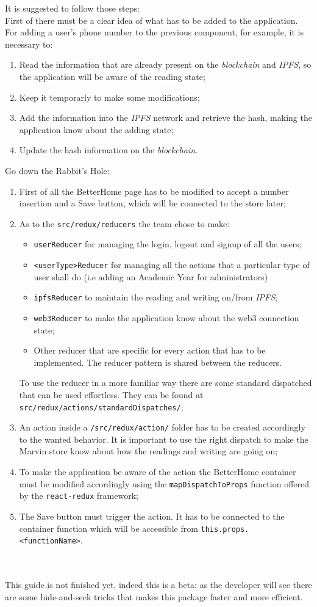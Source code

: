 It is suggested to follow those steps:
\\First of there must be a clear idea of what has to be added to the application. For adding a user's phone number to the previous component, for example, it is necessary to:
\begin{enumerate}
	\item Read the information that are already present on the \emph{blockchain} and \emph{IPFS}, so the application will be aware of the reading state;
	\item Keep it temporarly to make some modifications;
	\item Add the information into the \emph{IPFS} network and retrieve the hash, making the application know about the adding state;
	\item Update the hash information on the \emph{blockchain}.
\end{enumerate}

Go down the Rabbit's Hole:
\begin{enumerate}
	\item First of all the BetterHome page has to be modified to accept a number insertion and a Save button, which will be connected to the store later;
	\item As to the \verb|src/redux/reducers| the team chose to make:
	\begin{itemize}
		\item \verb|userReducer| for managing the login, logout and signup of all the users;
		\item \verb|<userType>Reducer| for managing all the actions that a particular type of user shall do (i.e adding an Academic Year for administrators)
		\item \verb|ipfsReducer| to maintain the reading and writing on/from \emph{IPFS};
		\item \verb|web3Reducer| to make the application know about the web3 connection state;
		\item Other reducer that are specific for every action that has to be implemented. The reducer pattern is shared between the reducers.
	\end{itemize}
	To use the reducer in a more familiar way there are some standard dispatched that can be used effortless. They can be found at \verb|src/redux/actions/standardDispatches/|;
	\item An action inside a \verb|/src/redux/action/| folder has to be created accordingly to the wanted behavior. It is important to use the right dispatch to make the Marvin store know about how the readings and writing are going on;
	\item To make the application be aware of the action the BetterHome container must be modified accordingly using the \verb|mapDispatchToProps| function offered by the \verb|react-redux| framework;
	\item The Save button must trigger the action. It has to be connected to the container function which will be accessible from \verb|this.props.<functionName>|.
\end{enumerate}

~\\
~\\
This guide is not finished yet, indeed this is a beta: as the developer will see there are some hide-and-seek tricks that makes this package faster and more efficient.

